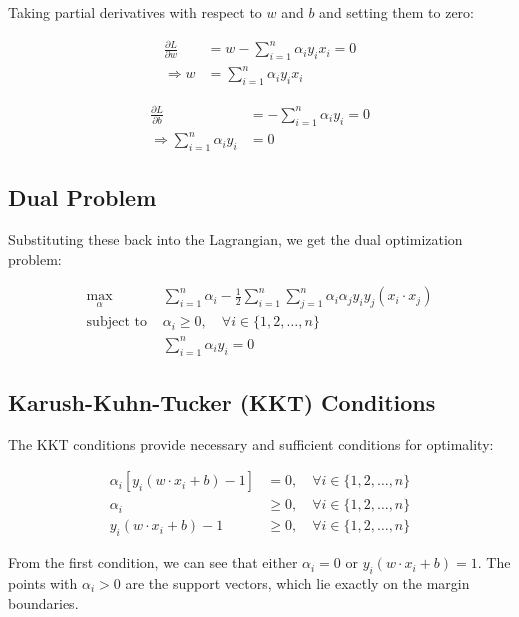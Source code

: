 \documentclass{article}
\begin{document}
Taking partial derivatives with respect to $w$ and $b$ and setting them to zero:

\begin{align}
\frac{\partial L}{\partial w} &= w - \sum_{i=1}^{n} \alpha_i y_i x_i = 0 \\
\Rightarrow w &= \sum_{i=1}^{n} \alpha_i y_i x_i
\end{align}

\begin{align}
\frac{\partial L}{\partial b} &= -\sum_{i=1}^{n} \alpha_i y_i = 0 \\
\Rightarrow \sum_{i=1}^{n} \alpha_i y_i &= 0
\end{align}

\subsection{Dual Problem}

Substituting these back into the Lagrangian, we get the dual optimization problem:

\begin{align}
\max_{\alpha} & \sum_{i=1}^{n} \alpha_i - \frac{1}{2} \sum_{i=1}^{n} \sum_{j=1}^{n} \alpha_i \alpha_j y_i y_j (x_i \cdot x_j) \\
\text{subject to } & \alpha_i \geq 0, \quad \forall i \in \{1, 2, \ldots, n\} \\
& \sum_{i=1}^{n} \alpha_i y_i = 0
\end{align}

\subsection{Karush-Kuhn-Tucker (KKT) Conditions}

The KKT conditions provide necessary and sufficient conditions for optimality:

\begin{align}
\alpha_i [y_i(w \cdot x_i + b) - 1] &= 0, \quad \forall i \in \{1, 2, \ldots, n\} \\
\alpha_i &\geq 0, \quad \forall i \in \{1, 2, \ldots, n\} \\
y_i(w \cdot x_i + b) - 1 &\geq 0, \quad \forall i \in \{1, 2, \ldots, n\}
\end{align}

From the first condition, we can see that either $\alpha_i = 0$ or $y_i(w \cdot x_i + b) = 1$. The points with $\alpha_i > 0$ are the support vectors, which lie exactly on the margin boundaries.
\end{document}
